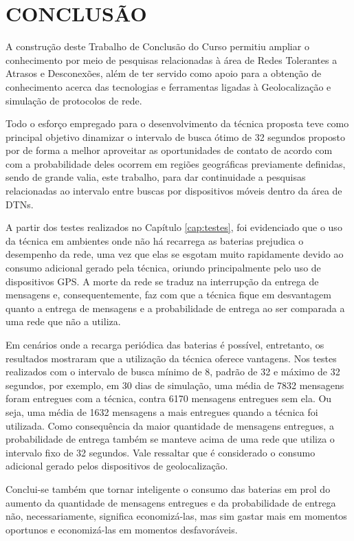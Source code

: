\chapter{CONCLUSÃO}\label{conc}

A construção deste Trabalho de Conclusão do Curso permitiu ampliar o conhecimento por meio de pesquisas relacionadas à área de Redes Tolerantes a Atrasos e Desconexões, além de ter servido como apoio para a obtenção de conhecimento acerca das tecnologias e ferramentas ligadas à Geolocalização e simulação de protocolos de rede.

Todo o esforço empregado para o desenvolvimento da técnica proposta teve como principal objetivo dinamizar o intervalo de busca ótimo de 32 segundos proposto por \cite{denis_artigo} de forma a melhor aproveitar as oportunidades de contato de acordo com com a probabilidade deles ocorrem em regiões geográficas previamente definidas, sendo de grande valia, este trabalho, para dar continuidade a pesquisas relacionadas ao intervalo entre buscas por dispositivos móveis dentro da área de DTNs.

A partir dos testes realizados no Capítulo \ref{cap:testes}, foi evidenciado que o uso da técnica em ambientes onde não há recarrega as baterias prejudica o desempenho da rede, uma vez que elas se esgotam muito rapidamente devido ao consumo adicional gerado pela técnica, oriundo principalmente pelo uso de dispositivos GPS. A morte da rede se traduz na interrupção da entrega de mensagens e, consequentemente, faz com que a técnica fique em desvantagem quanto a entrega de mensagens e a probabilidade de entrega ao ser comparada a uma rede que não a utiliza.

Em cenários onde a recarga periódica das baterias é possível, entretanto, os resultados mostraram que a utilização da técnica oferece vantagens. Nos testes realizados com o intervalo de busca mínimo de 8, padrão de 32 e máximo de 32 segundos, por exemplo, em 30 dias de simulação, uma média de 7832 mensagens foram entregues com a técnica, contra 6170 mensagens entregues sem ela. Ou seja, uma média de 1632 mensagens a mais entregues quando a técnica foi utilizada. Como consequência da maior quantidade de mensagens entregues, a probabilidade de entrega também se manteve acima de uma rede que utiliza o intervalo fixo de 32 segundos. Vale ressaltar que é considerado o consumo adicional gerado pelos dispositivos de geolocalização.

Conclui-se também que tornar inteligente o consumo das baterias em prol do aumento da quantidade de mensagens entregues e da probabilidade de entrega não, necessariamente, significa economizá-las, mas sim gastar mais em momentos oportunos e economizá-las em momentos desfavoráveis.

